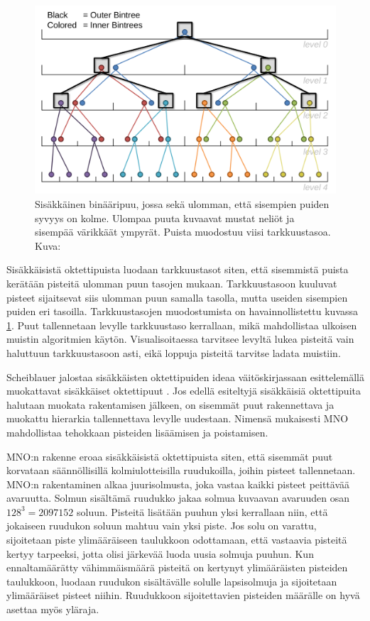 \begin{figure}
    \centering
    \includegraphics[width=0.6\paperwidth]{img/nested.png}
    \caption{Sisäkkäinen binääripuu, jossa sekä ulomman, että sisempien puiden syvyys on kolme. Ulompaa puuta kuvaavat mustat neliöt ja sisempää värikkäät ympyrät. Puista muodostuu viisi tarkkuustasoa. Kuva: \cite{scheiblauer}}
    \label{nested}
\end{figure}

Sisäkkäisistä oktettipuista luodaan tarkkuustasot siten, että sisemmistä puista kerätään pisteitä ulomman puun tasojen mukaan. Tarkkuustasoon kuuluvat pisteet sijaitsevat siis ulomman puun samalla tasolla, mutta useiden sisempien puiden eri tasoilla. Tarkkuustasojen muodostumista on havainnollistettu kuvassa \ref{nested}. Puut tallennetaan levylle tarkkuustaso kerrallaan, mikä mahdollistaa ulkoisen muistin algoritmien käytön. Visualisoitaessa tarvitsee levyltä lukea pisteitä vain haluttuun tarkkuustasoon asti, eikä loppuja pisteitä tarvitse ladata muistiin. \cite{ip}

Scheiblauer jalostaa sisäkkäisten oktettipuiden ideaa väitöskirjassaan esittelemällä muokattavat sisäkkäiset oktettipuut . Jos edellä esiteltyjä sisäkkäisiä oktettipuita halutaan muokata rakentamisen jälkeen, on sisemmät puut rakennettava ja muokattu hierarkia tallennettava levylle uudestaan. Nimensä mukaisesti MNO mahdollistaa tehokkaan pisteiden lisäämisen ja poistamisen. \cite{scheiblauer}  

MNO:n rakenne eroaa sisäkkäisistä oktettipuista siten, että sisemmät puut korvataan säännöllisillä kolmiulotteisilla ruudukoilla, joihin pisteet tallennetaan. MNO:n rakentaminen alkaa juurisolmusta, joka vastaa kaikki pisteet peittävää avaruutta. Solmun sisältämä ruudukko jakaa solmua kuvaavan avaruuden osan $128^3 = 2 097 152$ soluun. Pisteitä lisätään puuhun yksi kerrallaan niin, että jokaiseen ruudukon soluun mahtuu vain yksi piste. Jos solu on varattu, sijoitetaan piste ylimääräiseen taulukkoon odottamaan, että vastaavia pisteitä kertyy tarpeeksi, jotta olisi järkevää luoda uusia solmuja puuhun. Kun ennaltamäärätty vähimmäismäärä pisteitä on kertynyt ylimääräisten pisteiden taulukkoon, luodaan ruudukon sisältävälle solulle lapsisolmuja ja sijoitetaan ylimääräiset pisteet niihin. Ruudukkoon sijoitettavien pisteiden määrälle on hyvä asettaa myös yläraja. \cite{scheiblauer}

